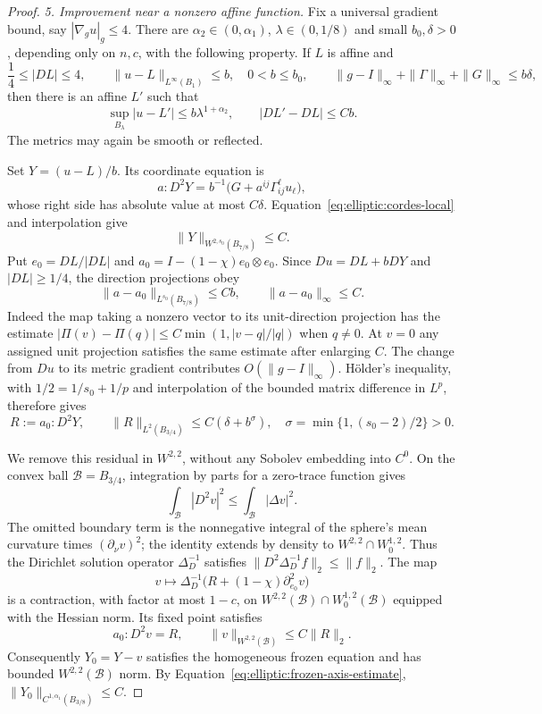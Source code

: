 \begin{proof}
\medskip\noindent
\emph{5. Improvement near a nonzero affine function.}
Fix a universal gradient bound, say $|\nabla_g u|_g\leq4$.
There are $\alpha_2\in(0,\alpha_1)$, $\lambda\in(0,1/8)$ and small
$b_0,\delta>0$, depending only on $n,c$, with the following property.
If $L$ is affine and
\begin{equation}
 \frac14\leq|DL|\leq4,\qquad
 \|u-L\|_{L^\infty(B_1)}\leq b,\quad 0<b\leq b_0,
 \qquad
 \|g-I\|_\infty+\|\Gamma\|_\infty+\|G\|_\infty\leq b\delta,
 \label{eq:elliptic:affine-improvement-hypotheses}
\end{equation}
then there is an affine $L'$ such that
\begin{equation}
 \sup_{B_\lambda}|u-L'|\leq b\lambda^{1+\alpha_2},
 \qquad |DL'-DL|\leq Cb.
 \label{eq:elliptic:affine-improvement}
\end{equation}
The metrics may again be smooth or reflected.

Set $Y=(u-L)/b$.  Its coordinate equation is
\[
 a:D^2Y=b^{-1}\bigl(G+a^{ij}\Gamma^\ell_{ij}u_\ell\bigr),
\]
whose right side has absolute value at most $C\delta$.
Equation~\eqref{eq:elliptic:cordes-local} and interpolation give
\begin{equation}
 \|Y\|_{W^{2,s_0}(B_{7/8})}\leq C.
 \label{eq:elliptic:normalized-remainder-sobolev}
\end{equation}
Put $e_0=DL/|DL|$ and $a_0=I-(1-\chi)e_0\otimes e_0$.
Since $Du=DL+bDY$ and $|DL|\geq1/4$, the direction projections obey
\[
 \|a-a_0\|_{L^{s_0}(B_{7/8})}\leq Cb,
 \qquad\|a-a_0\|_\infty\leq C.
\]
Indeed the map taking a nonzero vector to its unit-direction projection
has the estimate
$|\Pi(v)-\Pi(q)|\leq C\min(1,|v-q|/|q|)$ when $q\ne0$.
At $v=0$ any assigned unit projection satisfies the same estimate after
enlarging $C$.  The change from $Du$ to its metric gradient contributes
$O(\|g-I\|_\infty)$.
H\"older's inequality, with
$1/2=1/s_0+1/p$ and interpolation of the bounded matrix difference in
$L^p$, therefore gives
\begin{equation}
 R:=a_0:D^2Y,\qquad
 \|R\|_{L^2(B_{3/4})}\leq C(\delta+b^\sigma),
 \quad \sigma=\min\{1,(s_0-2)/2\}>0.
 \label{eq:elliptic:frozen-residual}
\end{equation}

We remove this residual in $W^{2,2}$, without any Sobolev embedding into
$C^0$.  On the convex ball $\mathcal B=B_{3/4}$, integration by parts
for a zero-trace function gives
\[
 \int_{\mathcal B}|D^2v|^2
   \leq\int_{\mathcal B}|\Delta v|^2.
\]
The omitted boundary term is the nonnegative integral of the sphere's
mean curvature times $(\partial_\nu v)^2$; the identity extends by
density to $W^{2,2}\cap W^{1,2}_0$.
Thus the Dirichlet solution operator $\Delta_D^{-1}$ satisfies
$\|D^2\Delta_D^{-1}f\|_2\leq\|f\|_2$.  The map
\[
 v\longmapsto\Delta_D^{-1}\bigl(R+(1-\chi)\partial_{e_0}^2v\bigr)
\]
is a contraction, with factor at most $1-c$, on
$W^{2,2}(\mathcal B)\cap W^{1,2}_0(\mathcal B)$ equipped with the Hessian
norm.  Its fixed point satisfies
\[
 a_0:D^2v=R,\qquad
 \|v\|_{W^{2,2}(\mathcal B)}\leq C\|R\|_2.
\]
Consequently $Y_0=Y-v$ satisfies the homogeneous frozen equation and has
bounded $W^{2,2}(\mathcal B)$ norm.  By
Equation~\eqref{eq:elliptic:frozen-axis-estimate},
$\|Y_0\|_{C^{1,\alpha_1}(B_{3/8})}\leq C$.


\end{proof}
